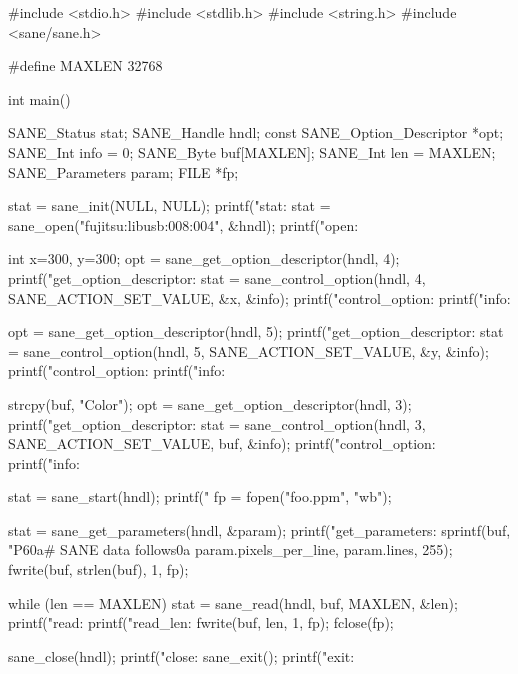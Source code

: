 \documentclass[mingoth,a4paper]{jsarticle}
\begin{document}
{{\begin{commandline}
#include <stdio.h>
#include <stdlib.h>
#include <string.h>
#include <sane/sane.h>

#define MAXLEN 32768

int main()
{
  SANE_Status stat;
  SANE_Handle hndl;
  const SANE_Option_Descriptor *opt;
  SANE_Int info = 0;
  SANE_Byte buf[MAXLEN];
  SANE_Int len = MAXLEN;
  SANE_Parameters param;
  FILE *fp;

  stat = sane_init(NULL, NULL);
  printf("stat: %
  stat = sane_open("fujitsu:libusb:008:004", &hndl);
  printf("open: %

  int x=300, y=300;
  opt = sane_get_option_descriptor(hndl, 4);
  printf("get_option_descriptor: %
  stat = sane_control_option(hndl, 4, SANE_ACTION_SET_VALUE, &x, &info);
  printf("control_option: %
  printf("info: %

  opt = sane_get_option_descriptor(hndl, 5);
  printf("get_option_descriptor: %
  stat = sane_control_option(hndl, 5, SANE_ACTION_SET_VALUE, &y, &info);
  printf("control_option: %
  printf("info: %

  strcpy(buf, "Color");
  opt = sane_get_option_descriptor(hndl, 3);
  printf("get_option_descriptor: %
  stat = sane_control_option(hndl, 3, SANE_ACTION_SET_VALUE, buf, &info);
  printf("control_option: %
  printf("info: %

  stat = sane_start(hndl);
  printf("%
  fp = fopen("foo.ppm", "wb");

  stat = sane_get_parameters(hndl, &param);
  printf("get_parameters: %
  sprintf(buf, "P6\x0a# SANE data follows\x0a%
    param.pixels_per_line, param.lines, 255);
  fwrite(buf, strlen(buf), 1, fp);


  while (len == MAXLEN) {
    stat = sane_read(hndl, buf, MAXLEN, &len);
    printf("read: %
    printf("read_len: %
    fwrite(buf, len, 1, fp);
  }
  fclose(fp);

  sane_close(hndl);
  printf("close: %
  sane_exit();
  printf("exit: %
}
\end{commandline}


}}
\end{document}
